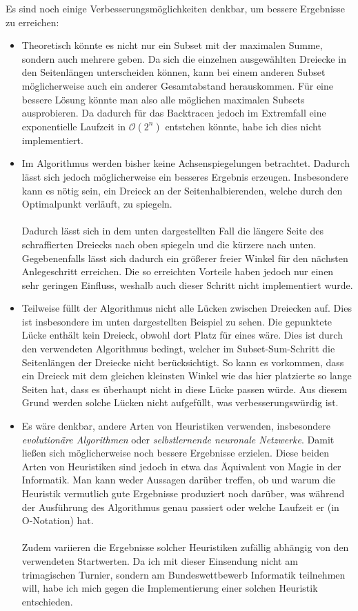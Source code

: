 \documentclass[a4paper, notitlepage, 12pt,headinclude]{scrartcl}
\begin{document}
  Es sind noch einige Verbesserungsmöglichkeiten denkbar, um bessere Ergebnisse zu erreichen:
  \begin{itemize}
  	\item Theoretisch könnte es nicht nur ein Subset mit der maximalen Summe, sondern auch mehrere geben. Da sich die einzelnen ausgewählten Dreiecke in den Seitenlängen unterscheiden können, kann bei einem anderen Subset möglicherweise auch ein anderer Gesamtabstand herauskommen. Für eine bessere Lösung könnte man also alle möglichen maximalen Subsets ausprobieren. Da dadurch für das Backtracen jedoch im Extremfall eine exponentielle Laufzeit in $\mathcal{O}(2^n)$ entstehen könnte, habe ich dies nicht implementiert.
  	\item Im Algorithmus werden bisher keine Achsenspiegelungen betrachtet. Dadurch lässt sich jedoch möglicherweise ein besseres Ergebnis erzeugen. Insbesondere kann es nötig sein, ein Dreieck an der Seitenhalbierenden, welche durch den Optimalpunkt verläuft, zu spiegeln. \\ \\ Dadurch lässt sich in dem unten dargestellten Fall die längere Seite des schraffierten Dreiecks nach oben spiegeln und die kürzere nach unten. Gegebenenfalls lässt sich dadurch ein größerer freier Winkel für den nächsten Anlegeschritt erreichen. Die so erreichten Vorteile haben jedoch nur einen sehr geringen Einfluss, weshalb auch dieser Schritt nicht implementiert wurde.
  	\item Teilweise füllt der Algorithmus nicht alle Lücken zwischen Dreiecken auf. Dies ist insbesondere im unten dargestellten Beispiel zu sehen. Die gepunktete Lücke enthält kein Dreieck, obwohl dort Platz für eines wäre. Dies ist durch den verwendeten Algorithmus bedingt, welcher im Subset-Sum-Schritt die Seitenlängen der Dreiecke nicht berücksichtigt. So kann es vorkommen, dass ein Dreieck mit dem gleichen kleinsten Winkel wie das hier platzierte so lange Seiten hat, dass es überhaupt nicht in diese Lücke passen würde. Aus diesem Grund werden solche Lücken nicht aufgefüllt, was verbesserungswürdig ist.
  	\item Es wäre denkbar, andere Arten von Heuristiken verwenden, insbesondere \textit{evolutionäre Algorithmen} oder \textit{selbstlernende neuronale Netzwerke}. Damit ließen sich möglicherweise noch bessere Ergebnisse erzielen. Diese beiden Arten von Heuristiken sind jedoch in etwa das Äquivalent von Magie in der Informatik. Man kann weder Aussagen darüber treffen, ob und warum die Heuristik vermutlich gute Ergebnisse produziert noch darüber, was während der Ausführung des Algorithmus genau passiert oder welche Laufzeit er (in O-Notation) hat. \\ \\
  	Zudem variieren die Ergebnisse solcher Heuristiken zufällig abhängig von den verwendeten Startwerten. Da ich mit dieser Einsendung nicht am trimagischen Turnier, sondern am Bundeswettbewerb Informatik teilnehmen will, habe ich mich gegen die Implementierung einer solchen Heuristik entschieden.
  \end{itemize}
\end{document}
